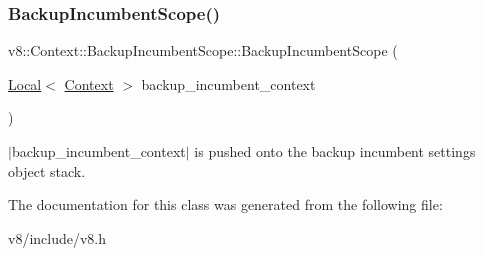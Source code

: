 \subsubsection{\texorpdfstring{Backup\+Incumbent\+Scope()}{BackupIncumbentScope()}}
{\footnotesize\ttfamily v8\+::\+Context\+::\+Backup\+Incumbent\+Scope\+::\+Backup\+Incumbent\+Scope (\begin{DoxyParamCaption}\item[{\mbox{\hyperlink{classv8_1_1Local}{Local}}$<$ \mbox{\hyperlink{classv8_1_1Context}{Context}} $>$}]{backup\+\_\+incumbent\+\_\+context }\end{DoxyParamCaption})\hspace{0.3cm}{\ttfamily [explicit]}}

$\vert$backup\+\_\+incumbent\+\_\+context$\vert$ is pushed onto the backup incumbent settings object stack. 

The documentation for this class was generated from the following file\+:\begin{DoxyCompactItemize}
\item 
v8/include/v8.\+h\end{DoxyCompactItemize}
